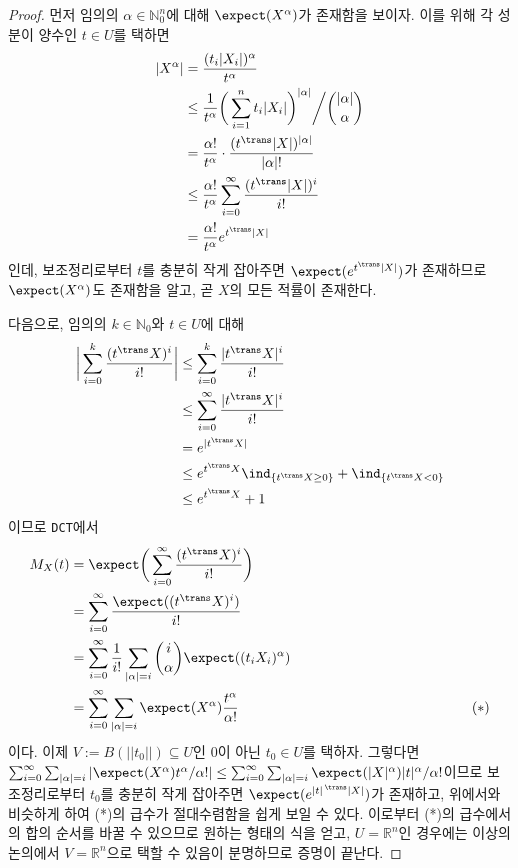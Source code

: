 \begin{proof}
    먼저 임의의 $\alpha\in\mathbb{N}_0^n$에 대해 $\expect(X^\alpha)$가 존재함을 보이자. 이를 위해 각 성분이 양수인 $t\in U$를 택하면
    \begin{align*}
        |X^\alpha|&=\frac{(t_i|X_i|)^\alpha}{t^\alpha}\\
        &\leq\frac{1}{t^\alpha}\bigg(\sum_{i=1}^nt_i|X_i|\bigg)^{|\alpha|}\bigg/\binom{|\alpha|}{\alpha}\\
        &=\frac{\alpha!}{t^\alpha}\cdot\frac{(t^\trans|X|)^{|\alpha|}}{|\alpha|!}\\
        &\leq\frac{\alpha!}{t^\alpha}\sum_{i=0}^\infty\frac{(t^\trans|X|)^i}{i!}\\
        &=\frac{\alpha!}{t^\alpha}e^{t^\trans|X|}
    \end{align*}
    인데, 보조정리로부터 $t$를 충분히 작게 잡아주면 $\expect(e^{t^\trans|X|})$가 존재하므로 $\expect(X^\alpha)$도 존재함을 알고, 곧 $X$의 모든 적률이 존재한다.

    다음으로, 임의의 $k\in\mathbb{N}_0$와 $t\in U$에 대해
    \begin{align*}
        \bigg|\sum_{i=0}^k\frac{(t^\trans X)^i}{i!}\bigg|&\leq\sum_{i=0}^k\frac{|t^\trans X|^i}{i!}\\
        &\leq\sum_{i=0}^\infty\frac{|t^\trans X|^i}{i!}\\
        &=e^{|t^\trans X|}\\
        &\leq e^{t^\trans X}\ind_{\{t^\trans X\geq0\}}+\ind_{\{t^\trans X<0\}}\\
        &\leq e^{t^\trans X}+1
    \end{align*}
    이므로 \texttt{DCT}에서
    \begin{align*}
        M_X(t)&=\expect\bigg(\sum_{i=0}^\infty\frac{(t^\trans X)^i}{i!}\bigg)\\
        &=\sum_{i=0}^\infty\frac{\expect((t^\trans X)^i)}{i!}\\
        &=\sum_{i=0}^\infty\frac{1}{i!}\sum_{|\alpha|=i}\binom{i}{\alpha}\expect((t_iX_i)^\alpha)\\
        &=\sum_{i=0}^\infty\sum_{|\alpha|=i}\expect(X^\alpha)\frac{t^\alpha}{\alpha!}&\qquad\qquad\qquad\qquad\qquad\qquad(*)
    \end{align*}
    이다. 이제 $V:=B(||t_0||)\subseteq U$인 $0$이 아닌 $t_0\in U$를 택하자. 그렇다면 $\sum_{i=0}^\infty\sum_{|\alpha|=i}|\expect(X^\alpha)t^\alpha/\alpha!|\leq\sum_{i=0}^\infty\sum_{|\alpha|=i}\expect(|X|^\alpha)|t|^\alpha/\alpha!$이므로 보조정리로부터 $t_0$를 충분히 작게 잡아주면 $\expect(e^{|t|^{\,\trans}|X|})$가 존재하고, 위에서와 비슷하게 하여 (*)의 급수가 절대수렴함을 쉽게 보일 수 있다. 이로부터 (*)의 급수에서의 합의 순서를 바꿀 수 있으므로 원하는 형태의 식을 얻고, $U=\mathbb{R}^n$인 경우에는 이상의 논의에서 $V=\mathbb{R}^n$으로 택할 수 있음이 분명하므로 증명이 끝난다.
\end{proof}

